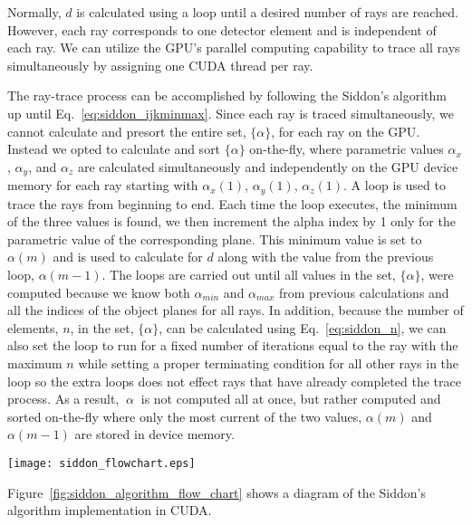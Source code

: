 Normally, $d$ is calculated using a loop until a desired number of rays are reached.  However, each ray corresponds to one detector element and is independent of each ray.  We can utilize the GPU's parallel computing capability to trace all rays simultaneously by assigning one CUDA thread per ray.

The ray-trace process can be accomplished by following the Siddon's algorithm up until Eq.~\ref{eq:siddon_ijkminmax}.  Since each ray is traced simultaneously, we cannot calculate and presort the entire set, $\{ \alpha \}$, for each ray on the GPU.  Instead we opted to calculate and sort $\{ \alpha \}$ on-the-fly, where parametric values $\alpha_x$, $\alpha_y$, and $\alpha_z$ are calculated simultaneously and independently on the GPU device memory for each ray starting with $\alpha_x(1)$, $\alpha_y(1)$, $\alpha_z(1)$.  A loop is used to trace the rays from beginning to end.  Each time the loop executes, the minimum of the three values is found, we then increment the alpha index by 1 only for the parametric value of the corresponding plane.  This minimum value is set to $\alpha(m)$ and is used to calculate for $d$ along with the value from the previous loop, $\alpha(m-1)$.  The loops are carried out until all values in the set, $\{ \alpha \}$, were computed because we know both $\alpha_{min}$ and $\alpha_{max}$ from previous calculations and all the indices of the object planes for all rays.  In addition, because the number of elements, $n$, in the set, $\{ \alpha \} $, can be calculated using Eq.~\ref{eq:siddon_n}, we can also set the loop to run for a fixed number of iterations equal to the ray with the maximum $n$ while setting a proper terminating condition for all other rays in the loop so the extra loops does not effect rays that have already completed the trace process.  As a result, $\ {\alpha\ }$ is not computed all at once, but rather computed and sorted on-the-fly where only the most current of the two values, $\alpha(m)$ and $\alpha(m-1)$ are stored in device memory.  
%
\begin{sidewaysfigure}
\texttt{[image: siddon\_flowchart.eps]}
\caption{The algorithm for Siddon's implementation on CUDA.}
\label{fig:siddon_algorithm_flow_chart}
\end{sidewaysfigure}
%
Figure~\ref{fig:siddon_algorithm_flow_chart} shows a diagram of the Siddon's algorithm implementation in CUDA.

